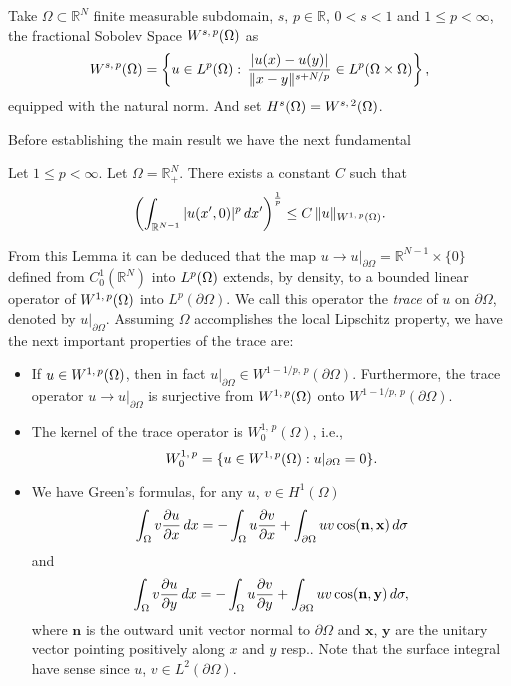 \begin{definition} Take $\Omega\subset \mathbb{R}^N$ finite measurable subdomain, $s,\,p\in \mathbb{R}$, $0<s<1$ and $1\leq p <\infty$, the fractional Sobolev Space ${W^{s,\,p}(\Omega)}$ as
$${W^{s,\,p}(\Omega)}=\left\{u\in {L^{p}(\Omega)}:\,\frac{|u(x)-u(y)|}{\|x-y\|^{s+N/p}} \in L^p(\Omega \times \Omega)\right\},$$
equipped with the natural norm. And set $H^{s}(\Omega)={W^{s,\,2}(\Omega)}$.
\end{definition}

Before establishing the main result we have the next fundamental
\begin{lemma}
 Let $1\leq p < \infty$. Let $\Omega = \mathbb{R}^N_+$. There exists a constant $C$ such that
 $$\left(\int_{\mathbb{R}^{N-1}}|u(x',0)|^p\,dx'\right)^\frac{1}{p}\leq C\, \|u\|_{W^{1,\,p}(\Omega)}.$$
 \end{lemma}
 From this Lemma it can be deduced that the map $u\rightarrow u|_{\partial \Omega}=\mathbb{R}^{N-1}\times \{0\}$ defined from $C_0^1\left(\mathbb{R}^N\right)$ into ${L^{p}(\Omega)}$ extends, by density, to a bounded linear operator of ${W^{1,\,p}(\Omega)}$ into $L^p(\partial \Omega)$. We call this operator the \emph{trace} of $u$ on $\partial \Omega$, denoted by $u|_{\partial \Omega}$. Assuming $\Omega$ accomplishes the local Lipschitz property, we have the next important properties of the trace are:
 \begin{itemize}
 \item If $u\in {W^{1,\,p}(\Omega)}$, then in fact $u|_{\partial \Omega}\in W^{1-1/p,\,p}(\partial \Omega)$. Furthermore, the trace operator $u\rightarrow u|_{\partial \Omega}$ is surjective from ${W^{1,\,p}(\Omega)}$ onto $W^{1-1/p,\,p}(\partial\Omega)$.
 \item The kernel of the trace operator is $W_0^{1,\,p}(\Omega)$, i.e.,
 $$W^{1,\,p}_0=\{u\in {W^{1,\,p}(\Omega)}: u|_{\partial \Omega}=0\}.$$
 \item We have Green's formulas, for any $u$, $v\in H^1(\Omega)$
 $$\int_\Omega v\frac{\partial u}{\partial x}\,dx = - \int_\Omega u\frac{\partial v}{\partial x}+\int_{\partial \Omega}uv \cos(\mathbf{n},\mathbf{x})\,d\sigma$$
 and
 $$\int_\Omega v\frac{\partial u}{\partial y}\,dx = - \int_\Omega u\frac{\partial v}{\partial y}+\int_{\partial \Omega}uv \cos(\mathbf{n},\mathbf{y})\,d\sigma,$$
where $\mathbf{n}$ is the outward unit vector normal to $\partial \Omega$ and $\mathbf{x}$, $\mathbf{y}$ are the unitary vector pointing positively along $x$ and $y$ resp.. Note that the surface integral have sense since $u$, $v\in L^2(\partial \Omega)$.
 \end{itemize}
 
